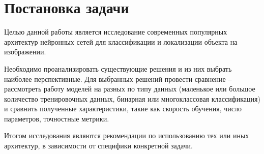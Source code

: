 \newpage
\section{Постановка задачи}
Целью данной работы является исследование современных популярных архитектур нейронных сетей для классификации и локализации объекта на изображении. 

Необходимо проанализировать существующие решения и из них выбрать наиболее перспективные. Для выбранных решений провести сравнение -- рассмотреть работу моделей на разных по типу данных (маленькое или большое количество тренировочных данных, бинарная или многоклассовая классификация) и сравнить полученные характеристики, такие как скорость обучения, число параметров, точностные метрики.

Итогом исследования являются рекомендации по использованию тех или иных архитектур, в зависимости от специфики конкретной задачи.